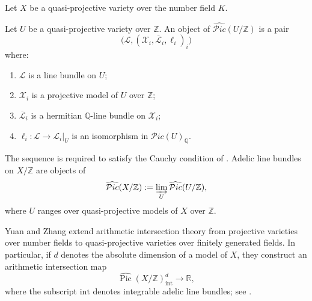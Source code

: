 \documentclass[10pt,a4paper]{amsart}
\theoremstyle{plain}
\theoremstyle{plain}
\numberwithin{equation}{section}
\begin{document}
Let \(X\) be a quasi-projective variety over the number field \(K\).
\begin{defn}
	Let \(U\) be a quasi-projective variety over \(\mathbb Z\).  An object of
	\(\widehat{\mathcal{P}ic}(U/\mathbb Z)\) is a pair
	\[
	\bigl(\mathcal L,(\mathcal X_i,\overline{\mathcal L}_i,\ell_i)_i\bigr)
	\]
	where:
	\begin{enumerate}[label=\textup{(\arabic*)},leftmargin=2em]
		\item \(\mathcal L\) is a line bundle on \(U\);
		\item \(\mathcal X_i\) is a projective model of \(U\) over \(\mathbb Z\);
		\item \(\overline{\mathcal L}_i\) is a hermitian
		\(\mathbb Q\)-line bundle on \(\mathcal X_i\);
		\item \(\ell_i:\mathcal L\to \mathcal L_i|_U\) is an isomorphism in
		\(\mathcal{P}ic(U)_{\mathbb Q}\).
	\end{enumerate}
	The sequence is required to satisfy the Cauchy condition of
	\cite[\S2.5.1]{YZ}.  Adelic line bundles on \(X/\mathbb Z\) are objects of
	\[
	\widehat{\mathcal{P}ic}(X/\mathbb Z)
	:=
	\varinjlim_U \widehat{\mathcal{P}ic}(U/\mathbb Z),
	\]
	where \(U\) ranges over quasi-projective models of \(X\) over \(\mathbb Z\).
\end{defn}
Yuan and Zhang extend arithmetic intersection theory from projective varieties
over number fields to quasi-projective varieties over finitely generated
fields.  In particular, if \(d\) denotes the absolute dimension of a model of
\(X\), they construct an arithmetic intersection map
\[
\widehat{\operatorname{Pic}}(X/\mathbb Z)^d_{\mathrm{int}}
\longrightarrow \mathbb R,
\]
where the subscript \(\mathrm{int}\) denotes integrable adelic line bundles;
see \cite[Definition~2.5.2 and Proposition~4.1.1]{YZ}.
\end{document}
